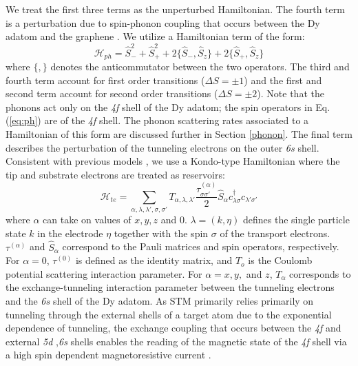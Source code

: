 \documentclass[reprint,amsmath,amssymb,aps,nofootinbib,onecolumn]{revtex4-2}
\begin{document}
We treat the first three terms as the unperturbed Hamiltonian. The fourth term is a perturbation due to spin-phonon coupling that occurs between the Dy adatom and the graphene \cite{Leuenberger2000,cervetti2016}. We utilize a Hamiltonian term of the form:
\begin{equation}
\mathcal{H}_{ph} = \hat{S}^{2}_{-} + \hat{S}^{2}_{+ } + 2 \{\hat{S}_{-},\hat{S}_{z}\} + 2 \{\hat{S}_{+},\hat{S}_{z}\}
\label{eq:ph}
\end{equation}
where $\{ ,\}$ denotes the anticommutator between the two operators. The third and fourth term account for first order transitions ($\Delta S = \pm 1$) and the first and second term account for second order transitions ($\Delta S = \pm 2$). Note that the phonons act only on the \textit{4f} shell of the Dy adatom; the spin operators in Eq. (\ref{eq:ph}) are of the \textit{4f} shell. The phonon scattering rates associated to a Hamiltonian of this form are discussed further in Section \ref{phonon}. The final term describes the perturbation of the tunneling electrons on the outer \textit{6s} shell. Consistent with previous models \cite{anderson1966,schrieffer1966,appelbaum1967,delgado2010,loth2010,Ternes2015}, we use a Kondo-type Hamiltonian where the tip and substrate electrons are treated as reservoirs:  
\begin{equation}
\mathcal{H}_{te} = \sum_{\alpha,\lambda, \lambda',\sigma,\sigma'} T_{\alpha,\lambda, \lambda'} \frac{\tau^{(\alpha)}_{\sigma\sigma'}}{2} \hat{S}_{\alpha} c^{\dagger}_{\lambda\sigma} c_{\lambda'\sigma'}
\end{equation}
where $\alpha$ can take on values of $x, y, z$ and $0$. $\lambda = (k,\eta)$ defines the single particle state $k$ in the electrode $\eta$ together with the spin $\sigma$ of the transport electrons. $\tau^{(\alpha)}$ and $\hat{S}_{\alpha}$ correspond to the Pauli matrices and spin operators, respectively. For $\alpha = 0$, $\tau^{(0)}$ is defined as the identity matrix, and $T_{o}$ is the Coulomb potential scattering interaction parameter. For $\alpha = x, y,$ and $z$, $T_{\alpha}$ corresponds to the exchange-tunneling interaction parameter between the tunneling electrons and the \textit{6s} shell of the Dy adatom. As STM primarily relies primarily on tunneling through the external shells of a target atom due to the exponential dependence of tunneling, the exchange coupling that occurs between the \textit{4f} and external \textit{5d} ,\textit{6s} shells enables the reading of the magnetic state of the \textit{4f} shell via a high spin dependent magnetoresistive current \cite{pivettaMeasuringIntraAtomicExchange2020}.\par
\end{document}
